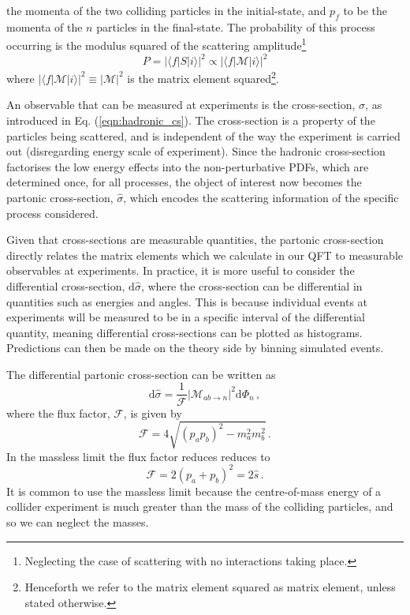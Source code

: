 \documentclass[main.tex]{subfiles}
\begin{document}
    the momenta of the two colliding
    particles in the initial-state, and $p_{f}$ to be the
    momenta of the $n$ particles in the final-state.
    The probability of this process occurring
    is the modulus squared of the scattering amplitude\footnote{Neglecting the case of scattering with no interactions taking place.}
    \begin{equation}\label{eqn:S_prob}
        P = |\langle f | S | i \rangle|^{2} \propto | \langle f | \mathcal{M} | i \rangle |^{2}
    \end{equation}
    where $|\langle f | \mathcal{M} | i \rangle|^{2}  \equiv |\mathcal{M}|^{2}$
    is the matrix element squared\footnote{Henceforth we refer to the matrix
    element squared as matrix element, unless stated otherwise.}.
    
    An observable that can be measured at experiments is
    the cross-section, $\sigma$, as introduced in
    Eq. (\ref{eqn:hadronic_cs}). The cross-section is a property
    of the particles being scattered, and is independent
    of the way the experiment is carried out (disregarding energy scale of experiment).
    Since the hadronic cross-section factorises
    the low energy effects into the non-perturbative PDFs,
    which are determined once, for all
    processes, the object of interest now becomes the
    partonic cross-section, $\hat{\sigma}$, which
    encodes the scattering information of the specific
    process considered.

    Given that cross-sections are measurable
    quantities, the partonic cross-section directly
    relates the matrix elements which we calculate in our QFT
    to measurable observables at experiments.
    In practice, it is more useful to consider the
    differential cross-section, $\mathrm{d}\hat{\sigma}$,
    where the cross-section can be differential
    in quantities such as energies and angles.
    This is because individual events at experiments
    will be measured to be in a specific interval of
    the differential quantity, meaning differential
    cross-sections can be plotted as histograms. Predictions
    can then be made on the theory side by binning simulated
    events.

    The differential partonic cross-section can be written as
    \begin{equation}\label{eqn:dsigma}
        \mathrm{d}\hat{\sigma} = \dfrac{1}{\mathcal{F}}|\mathcal{M}_{ab \rightarrow n}|^{2} \mathrm{d}\Phi_{n} \, ,
    \end{equation}
    where the flux factor, $\mathcal{F}$, is given by
    \begin{equation}\label{eqn:flux}
        \mathcal{F} = 4\sqrt{(p_{a}p_{b})^{2} - m_{a}^{2}m_{b}^{2}} \, .
    \end{equation}
    In the massless limit the flux factor reduces reduces to
    \begin{equation}\label{eqn:massless_flux}
        \mathcal{F} = 2(p_{a} + p_{b})^{2} = 2\hat{s} \, .
    \end{equation}
    It is common to use the massless limit because
    the centre-of-mass energy of a collider
    experiment is much greater than the mass
    of the colliding particles, and so we can
    neglect the masses.
\end{document}
